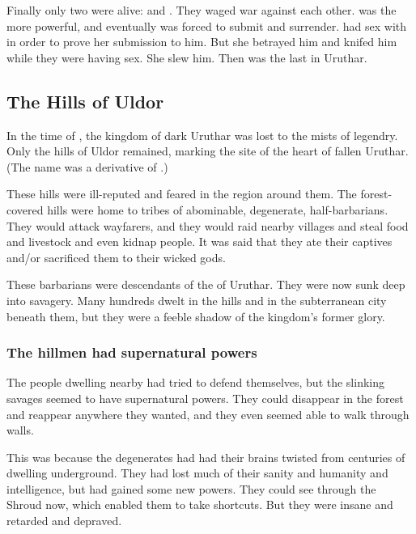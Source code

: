 Finally only two \resphain were alive:
 and . 
They waged war against each other. 
\Osra was the more powerful, and eventually \Lethiarch was forced to submit and surrender. 
\Lethiarch had sex with \Osra in order to prove her submission to him. 
But she betrayed him and knifed him while they were having sex.
She slew him. 
Then \Lethiarch was the last \resphan in Uruthar. 









\subsection{The Hills of Uldor}
In the time of \VizicarDurasRespina, the kingdom of dark Uruthar was lost to the mists of legendry. 
Only the hills of Uldor remained, marking the site of the heart of fallen Uruthar.
(The name  was a derivative of .) 

These hills were ill-reputed and feared in the region around them. 
The forest-covered hills were home to tribes of abominable, degenerate, half-\human barbarians. 
They would attack wayfarers, and they would raid nearby villages and steal food and livestock and even kidnap people. 
It was said that they ate their captives and/or sacrificed them to their wicked gods.

These barbarians were descendants of the \humans of Uruthar. 
They were now sunk deep into savagery. 
Many hundreds dwelt in the hills and in the subterranean city beneath them, but they were a feeble shadow of the kingdom's former glory.





\subsubsection{The hillmen had supernatural powers}
The people dwelling nearby had tried to defend themselves, but the slinking savages seemed to have supernatural powers. 
They could disappear in the forest and reappear anywhere they wanted, and they even seemed able to walk through walls. 

This was because the degenerates had had their brains twisted from centuries of dwelling underground. 
They had lost much of their sanity and humanity and intelligence, but had gained some new powers. 
They could see through the Shroud now, which enabled them to take shortcuts. 
But they were insane and retarded and depraved.

